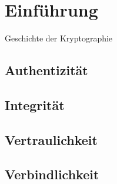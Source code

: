 
\chapter{Einführung} %

\label{ch:introduction} %


Geschichte der Kryptographie


\section{Authentizität}



\section{Integrität}



\section{Vertraulichkeit}



\section{Verbindlichkeit}
